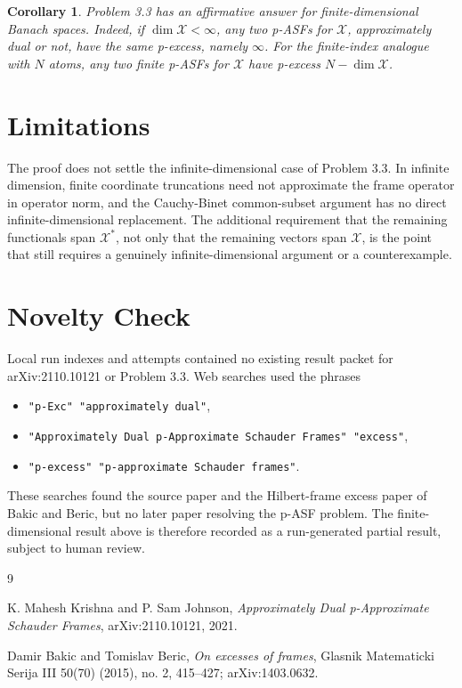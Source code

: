 \documentclass[11pt]{article}
\newtheorem{corollary}{Corollary}
\newcommand{\X}{\mathcal{X}}
\begin{document}
\begin{corollary}
Problem 3.3 has an affirmative answer for finite-dimensional Banach spaces.
Indeed, if \(\dim \X<\infty\), any two p-ASFs for \(\X\), approximately dual
or not, have the same p-excess, namely \(\infty\).  For the finite-index
analogue with \(N\) atoms, any two finite p-ASFs for \(\X\) have p-excess
\(N-\dim\X\).
\end{corollary}

\section*{Limitations}

The proof does not settle the infinite-dimensional case of Problem 3.3.  In
infinite dimension, finite coordinate truncations need not approximate the
frame operator in operator norm, and the Cauchy-Binet common-subset argument
has no direct infinite-dimensional replacement.  The additional requirement
that the remaining functionals span \(\X^*\), not only that the remaining
vectors span \(\X\), is the point that still requires a genuinely
infinite-dimensional argument or a counterexample.

\section*{Novelty Check}

Local run indexes and attempts contained no existing result packet for
arXiv:2110.10121 or Problem 3.3.  Web searches used the phrases
\begin{itemize}
\item \texttt{"p-Exc" "approximately dual"},
\item \texttt{"Approximately Dual p-Approximate Schauder Frames" "excess"},
\item \texttt{"p-excess" "p-approximate Schauder frames"}.
\end{itemize}
These searches found the source paper and the Hilbert-frame excess paper of
Bakic and Beric, but no later paper resolving the p-ASF problem.  The
finite-dimensional result above is therefore recorded as a run-generated
partial result, subject to human review.

\begin{thebibliography}{9}

K. Mahesh Krishna and P. Sam Johnson,
\emph{Approximately Dual p-Approximate Schauder Frames},
arXiv:2110.10121, 2021.

Damir Bakic and Tomislav Beric,
\emph{On excesses of frames},
Glasnik Matematicki Serija III 50(70) (2015), no. 2, 415--427;
arXiv:1403.0632.

\end{thebibliography}
\end{document}
